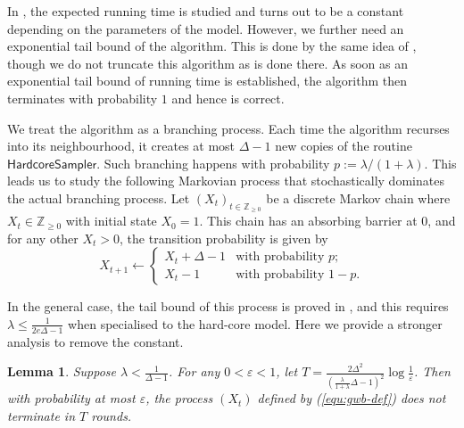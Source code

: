 \documentclass[11pt]{amsart}
\newtheorem{lemma}[theorem]{Lemma}
\theoremstyle{definition}
\theoremstyle{remark}
\newcommand{\hcsampler}{\mathsf{HardcoreSampler}}
\begin{document}
In \cite{AJ22}, the expected running time is studied and turns out to be a constant depending on the parameters of the model. 
However, we further need an exponential tail bound of the algorithm. 
This is done by the same idea of \cite[Section B.3]{FGWWY22}, 
though we do not truncate this algorithm as is done there. 
As soon as an exponential tail bound of running time is established, the algorithm then terminates with probability $1$ and hence is correct. 

We treat the algorithm as a branching process. 
Each time the algorithm recurses into its neighbourhood, it creates at most $\Delta-1$ new copies of the routine $\hcsampler{}$. 
Such branching happens with probability $p:=\lambda/(1+\lambda)$. 
This leads us to study the following Markovian process that stochastically dominates the actual branching process. 
Let $(X_t)_{t\in\mathbb{Z}_{\geq 0}}$ be a discrete Markov chain where $X_t\in\mathbb{Z}_{\geq 0}$ with initial state $X_0=1$. 
This chain has an absorbing barrier at $0$, and for any other $X_t>0$, the transition probability is given by
\begin{equation} \label{equ:gwb-def}
  X_{t+1}\leftarrow\begin{cases}
  X_t+\Delta-1 & \text{with probability } p; \\
  X_t-1 & \text{with probability } 1-p. 
  \end{cases}
\end{equation}

In the general case, the tail bound of this process is proved in \cite[Lemma B.12]{FGWWY22}, and this requires $\lambda\leq\frac{1}{2e\Delta-1}$ when specialised to the hard-core model. 
Here we provide a stronger analysis to remove the constant. 

\begin{lemma}\label{lem:gwb-terminate}
  Suppose $\lambda<\frac{1}{\Delta-1}$.
  For any $0<\varepsilon<1$, 
  let $T=\frac{2\Delta^2}{\left(\frac{\lambda}{1+\lambda}\Delta-1\right)^2}\log\frac{1}{\varepsilon}$. 
  Then with probability at most $\varepsilon$, the process $(X_t)$ defined by (\ref{equ:gwb-def}) does not terminate in $T$ rounds.  
\end{lemma}
\end{document}
